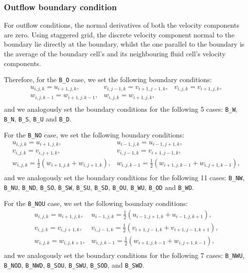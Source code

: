 \documentclass[a4paper, 12pt]{article}
\begin{document}
\subsubsection{Outflow boundary condition}
For outflow conditions, the normal derivatives of both the velocity components are zero. Using staggered grid, the discrete velocity component normal to the boundary lie directly at the boundary, whilst the one parallel to the boundary is the average of the boundary cell's and its neighbouring fluid cell's velocity components.

Therefore, for the \texttt{B\_O} case, we set the following boundary conditions:
\begin{equation}
\begin{array}{lll}
u_{i,j,k} = u_{i+1,j,k}, & v_{i,j-1,k} = v_{i+1,j-1,k}, & v_{i,j,k} = v_{i+1,j,k}, \\
w_{i,j,k-1} = w_{i+1,j,k-1}, & w_{i,j,k} = w_{i+1,j,k},& \\
\end{array}
\end{equation}
and we analogously set the boundary conditions for the following 5 cases: \texttt{B\_W}, \texttt{B\_N}, \texttt{B\_S}, \texttt{B\_U} and \texttt{B\_D}.

For the \texttt{B\_NO} case, we set the following boundary conditions:
\begin{equation}
\begin{array}{ll}
u_{i,j,k} = u_{i+1,j,k}, & u_{i-1,j,k} = u_{i-1,j+1,k}, \\
v_{i,j,k} = v_{i,j+1,k}, & v_{i,j-1,k} = v_{i+1,j-1,k}, \\
w_{i,j,k} = \frac{1}{2}(w_{i+1,j,k}+w_{i,j+1,k}), &
w_{i,j,k-1} = \frac{1}{2}(w_{i+1,j,k-1}+w_{i,j+1,k-1}), \\
\end{array}
\end{equation}
and we analogously set the boundary conditions for the following 11 cases: \texttt{B\_NW}, \texttt{B\_NU}, \texttt{B\_ND}, \texttt{B\_SO}, \texttt{B\_SW}, \texttt{B\_SU}, \texttt{B\_SD}, \texttt{B\_OU}, \texttt{B\_WU}, \texttt{B\_OD} and \texttt{B\_WD}.

For the \texttt{B\_NOU} case, we set the following boundary conditions:
\begin{equation}
\begin{array}{ll}
u_{i,j,k} = u_{i+1,j,k}, & u_{i-1,j,k} = \frac{1}{2}(u_{i-1,j+1,k}+u_{i-1,j,k+1}), \\
v_{i,j,k} = v_{i,j+1,k}, & v_{i,j-1,k} = \frac{1}{2}(v_{i+1,j-1,k}+v_{i+1,j-1,k+1}), \\
w_{i,j,k} = w_{i,j,k+1}, & w_{i,j,k-1} = \frac{1}{2}(w_{i+1,j,k-1}+w_{i,j+1,k-1}), \\
\end{array}
\end{equation}
and we analogously set the boundary conditions for the following 7 cases: \texttt{B\_NWU}, \texttt{B\_NOD}, \texttt{B\_NWD}, \texttt{B\_SOU}, \texttt{B\_SWU}, \texttt{B\_SOD}, and \texttt{B\_SWD}.
\end{document}
